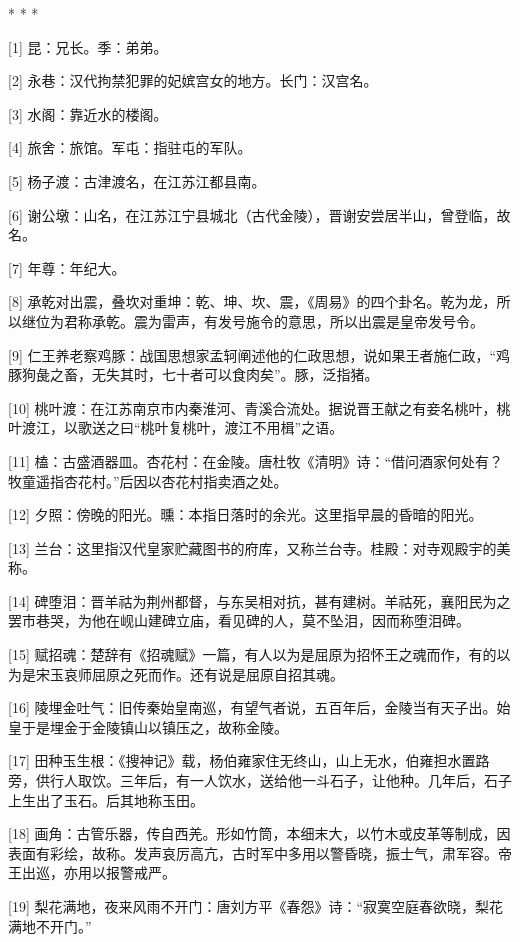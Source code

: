 \documentclass[12pt,UTF8]{ctexbook}
\begin{document}
* * *



[1] 昆：兄长。季：弟弟。

[2] 永巷：汉代拘禁犯罪的妃嫔宫女的地方。长门：汉宫名。

[3] 水阁：靠近水的楼阁。

[4] 旅舍：旅馆。军屯：指驻屯的军队。

[5] 杨子渡：古津渡名，在江苏江都县南。

[6] 谢公墩：山名，在江苏江宁县城北（古代金陵），晋谢安尝居半山，曾登临，故名。

[7] 年尊：年纪大。

[8] 承乾对出震，叠坎对重坤：乾、坤、坎、震，《周易》的四个卦名。乾为龙，所以继位为君称承乾。震为雷声，有发号施令的意思，所以出震是皇帝发号令。

[9] 仁王养老察鸡豚：战国思想家孟轲阐述他的仁政思想，说如果王者施仁政，“鸡豚狗彘之畜，无失其时，七十者可以食肉矣”。豚，泛指猪。

[10] 桃叶渡：在江苏南京市内秦淮河、青溪合流处。据说晋王献之有妾名桃叶，桃叶渡江，以歌送之曰“桃叶复桃叶，渡江不用楫”之语。

[11] 榼：古盛酒器皿。杏花村：在金陵。唐杜牧《清明》诗：“借问酒家何处有？牧童遥指杏花村。”后因以杏花村指卖酒之处。

[12] 夕照：傍晚的阳光。曛：本指日落时的余光。这里指早晨的昏暗的阳光。

[13] 兰台：这里指汉代皇家贮藏图书的府库，又称兰台寺。桂殿：对寺观殿宇的美称。

[14] 碑堕泪：晋羊祜为荆州都督，与东吴相对抗，甚有建树。羊祜死，襄阳民为之罢巿巷哭，为他在岘山建碑立庙，看见碑的人，莫不坠泪，因而称堕泪碑。

[15] 赋招魂：楚辞有《招魂赋》一篇，有人以为是屈原为招怀王之魂而作，有的以为是宋玉哀师屈原之死而作。还有说是屈原自招其魂。

[16] 陵埋金吐气：旧传秦始皇南巡，有望气者说，五百年后，金陵当有天子出。始皇于是埋金于金陵镇山以镇压之，故称金陵。

[17] 田种玉生根：《搜神记》载，杨伯雍家住无终山，山上无水，伯雍担水置路旁，供行人取饮。三年后，有一人饮水，送给他一斗石子，让他种。几年后，石子上生出了玉石。后其地称玉田。

[18] 画角：古管乐器，传自西羌。形如竹筒，本细末大，以竹木或皮革等制成，因表面有彩绘，故称。发声哀厉高亢，古时军中多用以警昏晓，振士气，肃军容。帝王出巡，亦用以报警戒严。

[19] 梨花满地，夜来风雨不开门：唐刘方平《春怨》诗：“寂寞空庭春欲晓，梨花满地不开门。”
\end{document}

